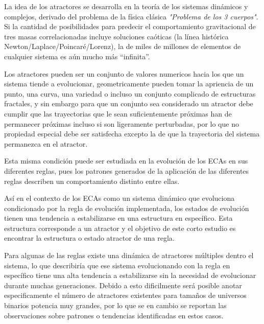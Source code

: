 \documentclass[]{article}
\begin{document}
		\hfill\break
		\justifying
		La idea de los atractores se desarrolla en la teoría de los sistemas dinámicos y complejos, derivado del problema de la física clásica \textit{"Problema de los 3 cuerpos"}. Si la cantidad de posibilidades para predecir el comportamiento gravitacional de tres masas correlacionadas incluye soluciones caóticas (la línea histórica Newton/Laplace/Poincaré/Lorenz), la de miles de millones de elementos de cualquier sistema es aún mucho más “infinita”.
		
		\hfill\break
		\justifying
		Los atractores pueden ser un conjunto de valores numericos hacia los que un sistema tiende a evolucionar, geometricamente pueden tomar la apriencia de un punto, una curva, una variedad o incluso un conjunto complicado de estructuras fractales, y sin embargo para que un conjunto sea considerado un atractor debe cumplir que las trayectorias que le sean suficientemente próximas han de permanecer próximas incluso si son ligeramente perturbadas, por lo que no propiedad especial debe ser satisfecha excepto la de que la trayectoria del sistema permanezca en el atractor.
		
		\hfill\break
		\justifying
		Esta misma condición puede ser estudiada en la evolución de los ECAs en sus diferentes reglas, pues los patrones generados de la aplicación de las diferentes reglas describen un comportamiento distinto entre ellas.
		
		\hfill\break
		\justifying
		Así en el contexto de los ECAs como un sistema dinámico que evoluciona condicionado por la regla de evolución implementada, los estados de evolución tienen una tendencia a estabilizarse en una estructura en específico. Esta estructura corresponde a un atractor y el objetivo de este corto estudio es encontrar la estructura o estado atractor de una regla.
		
		\hfill\break
		\justifying
		Para algunas de las reglas existe una dinámica de atractores múltiples dentro el sistema, lo que describiría que ese sistema evolucionando con la regla en específico tiene una alta tendencia a estabilizarse sin la necesidad de evolucionar durante muchas generaciones. Debido a esto dificilmente será posible anotar especificamente el número de atractores existentes para tamaños de universos binarios potencia muy grandes, por lo que se en cambio se reportan las observaciones sobre patrones o tendencias identificadas en estos casos.
		
		\newpage
\end{document}
